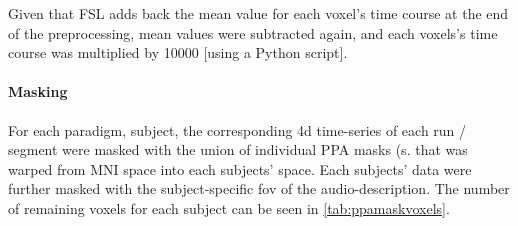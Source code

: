 
%
Given that FSL adds back the mean value for each voxel's time course at the end
of the preprocessing, mean values were subtracted again, and each voxels's time
course was multiplied by 10000 [using a Python script].


\paragraph{Masking}









For each paradigm, subject, the corresponding 4d time-series of each run /
segment were masked with the union of individual PPA masks (s.
\citep{haeusler2022processing} that was warped from MNI space into each
subjects' space. Each subjects' data were further masked with the
subject-specific \ac{fov} of the audio-description.
%
The number of remaining voxels for each subject can be seen in
\ref{tab:ppamaskvoxels}.

